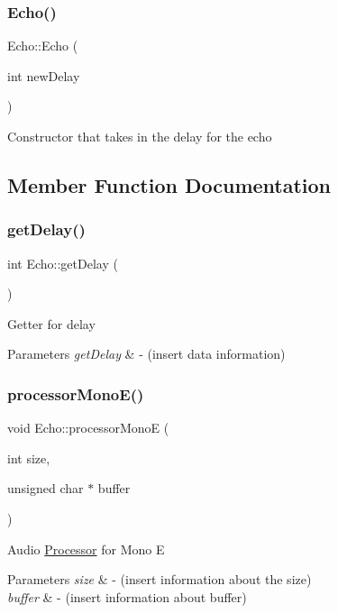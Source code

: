 \subsubsection{\texorpdfstring{Echo()}{Echo()}}
{\footnotesize\ttfamily Echo\+::\+Echo (\begin{DoxyParamCaption}\item[{int}]{new\+Delay }\end{DoxyParamCaption})}

Constructor that takes in the delay for the echo 

\subsection{Member Function Documentation}
\mbox{\label{classEcho_a57e19c9232f9bb96ccd78ba4bb68d6c9}} 
\subsubsection{\texorpdfstring{get\+Delay()}{getDelay()}}
{\footnotesize\ttfamily int Echo\+::get\+Delay (\begin{DoxyParamCaption}{ }\end{DoxyParamCaption})}

Getter for delay 
\begin{DoxyParams}{Parameters}
{\em get\+Delay} & -\/ (insert data information) \\
\hline
\end{DoxyParams}
\mbox{\label{classEcho_a472cc906604bcb493c6a6c1227436938}} 
\subsubsection{\texorpdfstring{processor\+Mono\+E()}{processorMonoE()}}
{\footnotesize\ttfamily void Echo\+::processor\+MonoE (\begin{DoxyParamCaption}\item[{int}]{size,  }\item[{unsigned char $\ast$}]{buffer }\end{DoxyParamCaption})}

Audio \hyperlink{classProcessor}{Processor} for Mono E 
\begin{DoxyParams}{Parameters}
{\em size} & -\/ (insert information about the size) \\
\hline
{\em buffer} & -\/ (insert information about buffer) \\
\hline
\end{DoxyParams}
\mbox{\label{classEcho_a298f9fe12295c578737928544c46be1a}} 
